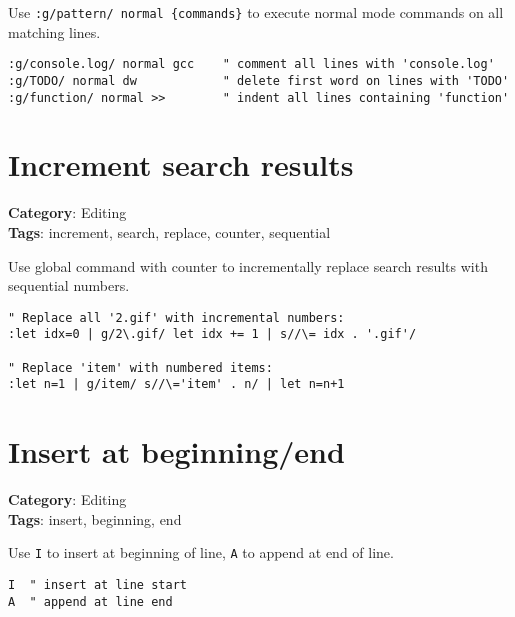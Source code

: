 {{{{Use {\footnotesize \Verb§:g/pattern/ normal {commands}§} to execute normal mode commands on all matching lines.

\begin{Exa*}{}
\begin{Verbatim}[fontsize=\footnotesize, breaklines, breakanywhere]
:g/console.log/ normal gcc    " comment all lines with 'console.log'
:g/TODO/ normal dw            " delete first word on lines with 'TODO'
:g/function/ normal >>        " indent all lines containing 'function'
\end{Verbatim}
\end{Exa*}

\section{Increment search results}

\textbf{Category}: Editing\\ \textbf{Tags}: increment, search, replace, counter, sequential
\vspace{0.5cm}

Use global command with counter to incrementally replace search results with sequential numbers.

\begin{Exa*}{}
\begin{Verbatim}[fontsize=\footnotesize, breaklines, breakanywhere]
" Replace all '2.gif' with incremental numbers:
:let idx=0 | g/2\.gif/ let idx += 1 | s//\= idx . '.gif'/

" Replace 'item' with numbered items:
:let n=1 | g/item/ s//\='item' . n/ | let n=n+1
\end{Verbatim}
\end{Exa*}

\section{Insert at beginning/end}

\textbf{Category}: Editing\\ \textbf{Tags}: insert, beginning, end
\vspace{0.5cm}

Use {\footnotesize \Verb§I§} to insert at beginning of line, {\footnotesize \Verb§A§} to append at end of line.

\begin{Exa*}{}
\begin{Verbatim}[fontsize=\footnotesize, breaklines, breakanywhere]
I  " insert at line start
A  " append at line end
\end{Verbatim}
\end{Exa*}

}}}}
